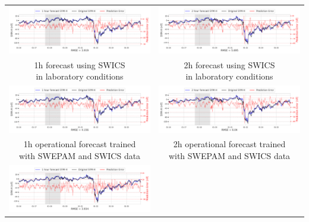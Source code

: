 \documentclass[draft,sw]{agutexSI2019}
\begin{document}
\begin{table}
\centering
\begin{tabular}{cc}
\includegraphics[width=0.49\linewidth]{paper_plots_shade/1h_swics/1h_swics_storm_30.png}
&
\includegraphics[width=0.49\linewidth]{paper_plots_shade/2h_swics/2h_swics_storm_30.png}
\\
\shortstack{1h forecast using SWICS\\ in laboratory conditions} & \shortstack{2h forecast using SWICS\\ in laboratory conditions}
\vspace*{12pt}
\\
\includegraphics[width=0.49\linewidth]{paper_plots_shade/1h_swics_rt/1h_swics_rt_storm_30.png}
&
\includegraphics[width=0.49\linewidth]{paper_plots_shade/2h_swics_rt/2h_swics_rt_storm_30.png}
\\
\shortstack{1h operational forecast trained\\ with SWEPAM and SWICS data} & \shortstack{2h operational forecast trained\\ with SWEPAM and SWICS data}
\vspace*{12pt}
\\
\includegraphics[width=0.49\linewidth]{paper_plots_shade/1h_swepam_rt/1h_swepam_rt_storm_30.png}

\end{tabular}
\end{table}
\end{document}
